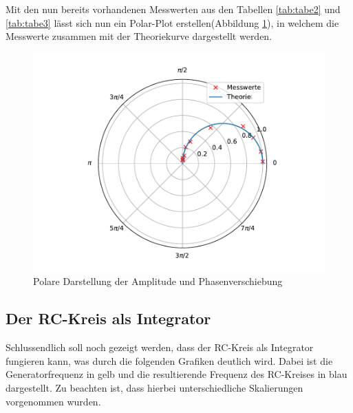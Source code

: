 Mit den nun bereits vorhandenen Messwerten aus den Tabellen \ref{tab:tabe2}
und \ref{tab:tabe3} lässt sich nun ein Polar-Plot erstellen(Abbildung \ref{fig:polar}),
in welchem die Messwerte zusammen mit der Theoriekurve dargestellt werden.
\begin{figure}[H]
  \centering
  \includegraphics{plot4.pdf}
  \caption{Polare Darstellung der Amplitude und Phasenverschiebung}
  \label{fig:polar}
\end{figure}

\subsection{Der RC-Kreis als Integrator}
Schlussendlich soll noch gezeigt werden, dass der RC-Kreis als Integrator
fungieren kann, was durch die folgenden Grafiken deutlich wird. Dabei ist die
Generatorfrequenz in gelb und die resultierende Frequenz des RC-Kreises in blau
dargestellt. Zu beachten ist, dass hierbei unterschiedliche Skalierungen
vorgenommen wurden.

